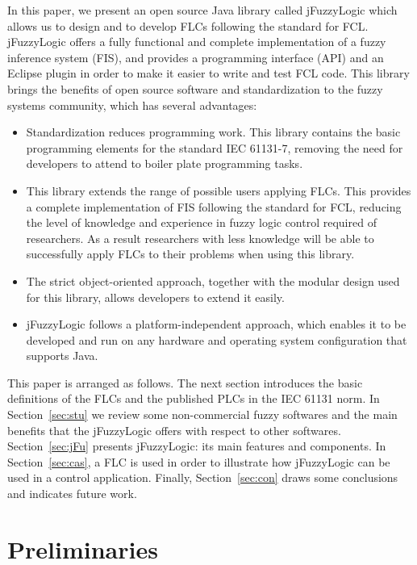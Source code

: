 \documentclass[11pt,twoside]{article}
\begin{document}
\begin{multicols}{2}
In this paper, we present an open source Java library called jFuzzyLogic which allows us to design and to develop FLCs following the standard for FCL. jFuzzyLogic offers a fully functional and complete implementation of a fuzzy inference system (FIS), and provides a programming interface (API) and an Eclipse plugin in order to make it easier to write and test FCL code. This library brings the benefits of open source software and standardization to the fuzzy systems community, which has several advantages:
\begin{itemize}
	\item Standardization reduces programming work. This library contains the basic programming elements for the standard IEC 61131-7, removing the need for developers to attend to boiler plate programming tasks.
	\item This library extends the range of possible users applying FLCs. This provides a complete implementation of FIS following the standard for FCL, reducing the level of knowledge and experience in fuzzy logic control required of researchers. As a result researchers with less knowledge will be able to successfully apply FLCs to their problems when using this library.
	\item The strict object-oriented approach, together with the modular design used for this library, allows developers to extend it easily.
	\item jFuzzyLogic follows a platform-independent approach, which enables it to be developed and run on any hardware and operating system configuration that supports Java.
\end{itemize}

This paper is arranged as follows. The next section introduces the basic definitions of the FLCs and the published PLCs in the IEC 61131 norm. In Section~\ref{sec:stu} we review some non-commercial fuzzy softwares and the main benefits that the jFuzzyLogic offers with respect to other softwares. Section~\ref{sec:jFu} presents jFuzzyLogic: its main features and components. In Section~\ref{sec:cas}, a FLC is used in order to illustrate how jFuzzyLogic can be used in a control application. Finally, Section~\ref{sec:con} draws some conclusions and indicates future work.


\section{Preliminaries}


\end{multicols}
\end{document}
